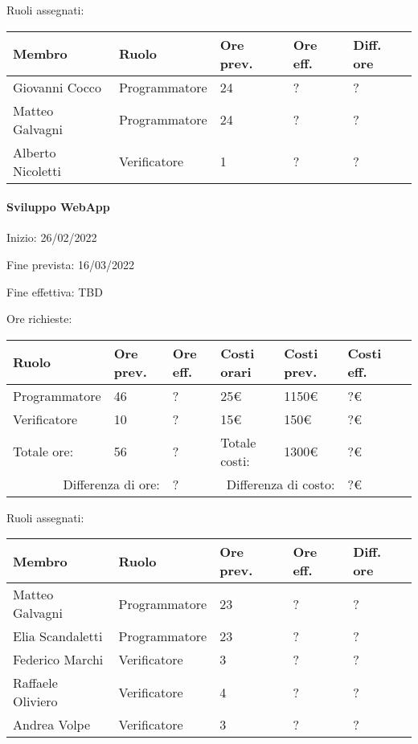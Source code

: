 \documentclass[a4paper, 12pt]{article}
\begin{document}
Ruoli assegnati:\\[0.5em]
\begin{tabular}{|l|l|l|l|l|}\hline
Membro & Ruolo & Ore prev. & Ore eff. & Diff. ore \\\hline
Giovanni Cocco & Programmatore & 24 & ? & ? \\\hline
Matteo Galvagni & Programmatore & 24 & ? & ? \\\hline
Alberto Nicoletti & Verificatore & 1 & ? & ? \\\hline
\end{tabular}

\paragraph{Sviluppo WebApp}
Inizio: 26/02/2022\par
Fine prevista: 16/03/2022\par
Fine effettiva: TBD

Ore richieste:\\[0.5em]
\begin{tabular}{|l|l|l||l|l|l|l|}\hline
Ruolo & Ore prev. & Ore eff. & Costi orari & Costi prev. & Costi eff.\\\hline
Programmatore & 46 & ? & 25\euro & 1150\euro & ?\euro \\\hline
Verificatore & 10 & ? & 15\euro & 150\euro & ?\euro \\\hline
Totale ore: & 56 & ? & Totale costi: & 1300\euro & ?\euro \\\hline
\multicolumn{2}{|r|}{Differenza di ore:} & ? & \multicolumn{2}{r|}{Differenza di costo:} & ?\euro \\\hline
\end{tabular}

Ruoli assegnati:\\[0.5em]
\begin{tabular}{|l|l|l|l|l|}\hline
Membro & Ruolo & Ore prev. & Ore eff. & Diff. ore \\\hline
Matteo Galvagni & Programmatore & 23 & ? & ? \\\hline
Elia Scandaletti & Programmatore & 23 & ? & ? \\\hline
Federico Marchi & Verificatore & 3 & ? & ? \\\hline
Raffaele Oliviero & Verificatore & 4 & ? & ? \\\hline
Andrea Volpe & Verificatore & 3 & ? & ? \\\hline
\end{tabular}
\end{document}
